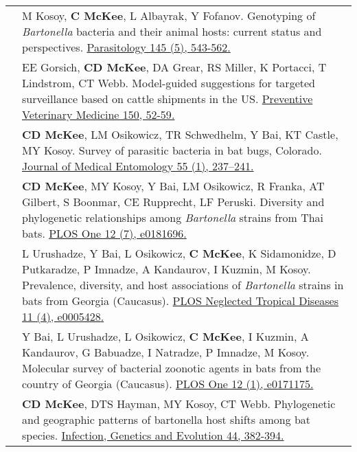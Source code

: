 \documentclass[letterpaper]{deedy-resume} %
\begin{document}
\begin{tabular}{>{\raggedright\arraybackslash}p{2cm}p{16cm}}
2018 & M Kosoy, \textbf{C McKee}, L Albayrak, Y Fofanov. Genotyping of \textit{Bartonella} bacteria and their animal hosts: current status and perspectives. \href{https://doi.org/10.1017/S0031182017001263}{\textcolor{special}{Parasitology 145 (5), 543-562}.}\\

2018 & EE Gorsich, \textbf{CD McKee}, DA Grear, RS Miller, K Portacci, T Lindstrom, CT Webb. Model-guided suggestions for targeted surveillance based on cattle shipments in the US. \href{https://doi.org/10.1016/j.prevetmed.2017.12.004}{\textcolor{special}{Preventive Veterinary Medicine 150, 52-59}.}\\

2018 & \textbf{CD McKee}, LM Osikowicz, TR Schwedhelm, Y Bai, KT Castle, MY Kosoy. Survey of parasitic bacteria in bat bugs, Colorado. \href{https://doi.org/10.1093/jme/tjx155}{\textcolor{special}{Journal of Medical Entomology 55 (1), 237–241}.}\\

2017 & \textbf{CD McKee}, MY Kosoy, Y Bai, LM Osikowicz, R Franka, AT Gilbert, S Boonmar, CE Rupprecht, LF Peruski. Diversity and phylogenetic relationships among \textit{Bartonella} strains from Thai bats. \href{https://doi.org/10.1371/journal.pone.0181696}{\textcolor{special}{PLOS One 12 (7), e0181696}.}\\

2017 & L Urushadze, Y Bai, L Osikowicz, \textbf{C McKee}, K Sidamonidze, D Putkaradze, P Imnadze, A Kandaurov, I Kuzmin, M Kosoy. Prevalence, diversity, and host associations of \textit{Bartonella} strains in bats from Georgia (Caucasus). \href{https://doi.org/10.1371/journal.pntd.0005428}{\textcolor{special}{PLOS Neglected Tropical Diseases 11 (4), e0005428}.}\\

2017 & Y Bai, L Urushadze, L Osikowicz, \textbf{C McKee}, I Kuzmin, A Kandaurov, G Babuadze, I Natradze, P Imnadze, M Kosoy. Molecular survey of bacterial zoonotic agents in bats from the country of Georgia (Caucasus). \href{https://doi.org/10.1371/journal.pone.0171175}{\textcolor{special}{PLOS One 12 (1), e0171175}.}\\

2016 & \textbf{CD McKee}, DTS Hayman, MY Kosoy, CT Webb. Phylogenetic and geographic patterns of bartonella host shifts among bat species. \href{https://doi.org/10.1016/j.meegid.2016.07.033}{\textcolor{special}{Infection, Genetics and Evolution 44, 382-394}.}\\


\end{tabular}
\end{document}
